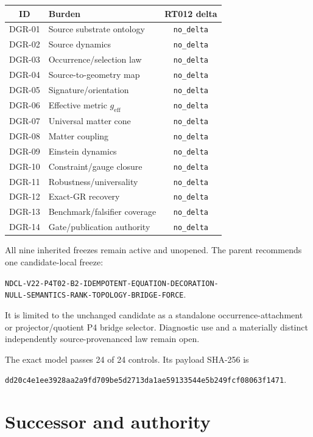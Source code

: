 \documentclass[11pt]{article}
\begin{document}
\begin{longtable}{clc}
\toprule
ID & Burden & RT012 delta \\
\midrule
DGR-01 & Source substrate ontology & \texttt{no\_delta} \\
DGR-02 & Source dynamics & \texttt{no\_delta} \\
DGR-03 & Occurrence/selection law & \texttt{no\_delta} \\
DGR-04 & Source-to-geometry map & \texttt{no\_delta} \\
DGR-05 & Signature/orientation & \texttt{no\_delta} \\
DGR-06 & Effective metric $g_{\mathrm{eff}}$ & \texttt{no\_delta} \\
DGR-07 & Universal matter cone & \texttt{no\_delta} \\
DGR-08 & Matter coupling & \texttt{no\_delta} \\
DGR-09 & Einstein dynamics & \texttt{no\_delta} \\
DGR-10 & Constraint/gauge closure & \texttt{no\_delta} \\
DGR-11 & Robustness/universality & \texttt{no\_delta} \\
DGR-12 & Exact-GR recovery & \texttt{no\_delta} \\
DGR-13 & Benchmark/falsifier coverage & \texttt{no\_delta} \\
DGR-14 & Gate/publication authority & \texttt{no\_delta} \\
\bottomrule
\end{longtable}

All nine inherited freezes remain active and unopened.  The parent recommends
one candidate-local freeze:
\begin{center}
\texttt{NDCL-V22-P4T02-B2-IDEMPOTENT-EQUATION-DECORATION-}\\
\texttt{NULL-SEMANTICS-RANK-TOPOLOGY-BRIDGE-FORCE}.
\end{center}
It is limited to the unchanged candidate as a standalone occurrence-attachment or
projector/quotient P4 bridge selector.  Diagnostic use and a materially
distinct independently source-provenanced law remain open.

The exact model passes 24 of 24 controls.  Its payload SHA-256 is
\begin{center}
\small\texttt{dd20c4e1ee3928aa2a9fd709be5d2713da1ae59133544e5b249fcf08063f1471}.
\end{center}

\section{Successor and authority}
\enlargethispage{4\baselineskip}
\end{document}
